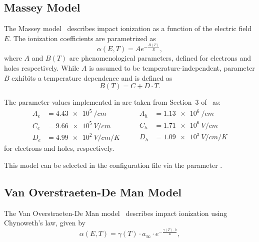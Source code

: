 \subsection{Massey Model}
\label{sec:multi:massey}

The Massey model~\cite{massey} describes impact ionization as a function of the electric field $E$.
The ionization coefficients are parametrized as
\begin{equation}
    \label{eq:multi:massey}
    \alpha (E, T) = A e^{-\frac{B(T)}{E}},
\end{equation}
where $A$ and $B(T)$ are phenomenological parameters, defined for electrons and holes respectively.
While $A$ is assumed to be temperature-independent, parameter $B$ exhibits a temperature dependence and is defined as
\begin{equation}
    B(T) = C + D \cdot T.
\end{equation}

The parameter values implemented in \apsq are taken from Section~3 of~\cite{massey} as:
\begin{equation*}
    \begin{split}
        A_{e} &= \SI{4.43e5}{/cm}\\
        C_{e} &= \SI{9.66e5}{V/cm}\\
        D_{e} &= \SI{4.99e2}{V/cm/K}
    \end{split}
    \qquad
    \begin{split}
        A_{h} &= \SI{1.13e6}{/cm}\\
        C_{h} &= \SI{1.71e6}{V/cm}\\
        D_{h} &= \SI{1.09e3}{V/cm/K}
    \end{split}
\end{equation*}
for electrons and holes, respectively.

This model can be selected in the configuration file via the parameter .


\subsection{Van Overstraeten-De Man Model}
\label{sec:multi:man}

The Van Overstraeten-De Man model~\cite{overstraeten} describes impact ionization using Chynoweth's law, given by
\begin{equation}
    \label{eq:multi:man}
    \alpha (E, T) = \gamma (T) \cdot a_{\infty} \cdot e^{-\frac{\gamma(T) \cdot b}{E}},
\end{equation}

